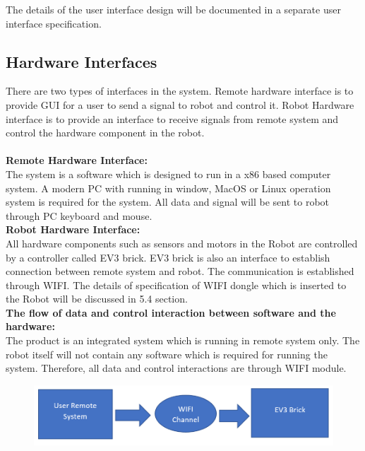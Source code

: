\documentclass[10pt,a4paper,titlepage]{article}
\begin{document}
The details of the user interface design will be documented in a separate user interface specification.



\subsection{Hardware Interfaces}

There are two types of interfaces in the system. Remote hardware interface is to provide GUI for a user to send a signal to robot and control it. Robot Hardware interface is to provide an interface to receive signals from remote system and control the hardware component in the robot.\\\\

\textbf{Remote Hardware Interface:}\\

The system is a software which is designed to run in a x86 based computer system. A modern PC with running in window, MacOS or Linux operation system is required for the system. All data and signal will be sent to robot through PC keyboard and mouse.\\

\textbf{Robot Hardware Interface:}\\

All hardware components such as sensors and motors in the Robot are controlled by a controller called EV3 brick. EV3 brick is also an interface to establish connection between remote system and robot. The communication is established through WIFI. The details of specification of WIFI dongle which is inserted to the Robot will be discussed in 5.4 section.\\

\textbf{The flow of data and control interaction between software and the hardware:}\\

The product is an integrated system which is running in remote system only. The robot itself will not contain any software which is required for running the system. Therefore, all data and control interactions are through WIFI module.\\

\begin{figure}[h]
	\includegraphics[width=\linewidth]{data_and_control.PNG}
	\label{fig:Flow of data and control interaction}
\end{figure}
\end{document}
